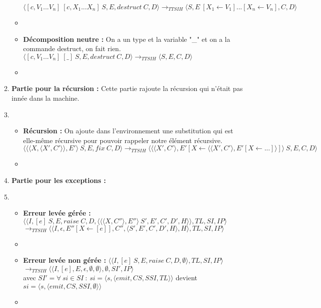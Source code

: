 \documentclass[10pt,a4paper]{report}
\begin{document}
\begin{enumerate}
\begin{itemize}
			\smallbreak
			$\langle [c,V_{1}...V_{n}]~[c,X_{1}...X_{n}]~S,E,destruct~C,D\rangle
			\longrightarrow_{TTSIH} \langle S,E~[X_{1} \leftarrow V_{1}]...[X_{n} \leftarrow V_{n}],C,D\rangle$ 
			\item[]
			\item[] \textbf{Décomposition neutre :} On a un type et la variable "\_" et on a la commande destruct, on fait rien.
			\smallbreak
			$\langle [c,V_{1}...V_{n}]~[\_]~S,E,destruct~C,D\rangle
			\longrightarrow_{TTSIH} \langle S,E,C,D\rangle$ 
			\item[]
		\end{itemize}
		\item[] \textbf{Partie pour la récursion :} Cette partie rajoute la récursion qui n'était pas innée dans la machine.
		\item[]
		\begin{itemize}
			\item[] \textbf{Récursion :} On ajoute dans l'environnement une substitution qui est elle-même récursive pour pouvoir rappeler notre élément récursive.
			\smallbreak
			$\langle \langle\langle X,\langle X',C'\rangle\rangle,E'\rangle~S,E,fix~C,D\rangle
			\longrightarrow_{TTSIH} \langle \langle\langle X',C'\rangle,E' [X \leftarrow \langle\langle X',C'\rangle,E'[X \leftarrow ...]\rangle]\rangle~S,E,C,D\rangle$ 
			\item[]
		\end{itemize}\newpage
		\item[] \textbf{Partie pour les exceptions :}
		\item[]
		\begin{itemize}
			\item[] \textbf{Erreur levée  gérée :}
			\smallbreak
			$\langle\langle I,[e]~S,E,raise~C,D,\langle \langle\langle X,C''\rangle,E''\rangle~S',E',C',D',H\rangle\rangle,TL,SI,IP\rangle$
			\smallbreak
			$\longrightarrow_{TTSIH} \langle\langle I,\epsilon,E'' [X \leftarrow [e]],C'',\langle S',E',C',D',H\rangle,H\rangle,TL,SI,IP\rangle$ 
			\item[]
			\item[] \textbf{Erreur levée  non gérée :}
			\smallbreak
			$\langle\langle I,[e]~S,E,raise~C,D,\emptyset\rangle,TL,SI,IP\rangle$
			$\longrightarrow_{TTSIH} \langle\langle I,[e],E,\epsilon,\emptyset,\emptyset\rangle,\emptyset,SI',IP\rangle$ \\avec $SI' = \forall~si \in SI~:~si = \langle s,\langle emit,CS,SSI,TL\rangle\rangle$ devient $si = \langle s,\langle emit,CS,SSI,\emptyset\rangle\rangle$ 
			\item[]

\end{itemize}
\end{enumerate}
\end{document}
